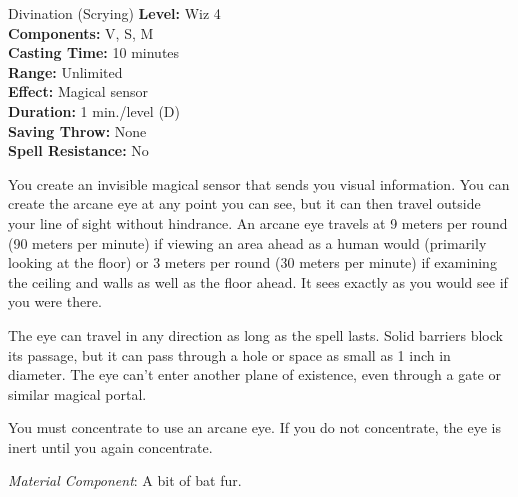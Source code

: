 {Divination (Scrying)}
{
	\textbf{Level:}
	Wiz 4\\
	\textbf{Components:}
	V, S, M\\
	\textbf{Casting Time:}
	10 minutes\\
	\textbf{Range:}
	Unlimited\\
	\textbf{Effect:}
	Magical sensor\\
	\textbf{Duration:}
	1 min./level (D)\\
	\textbf{Saving Throw:}
	None\\
	\textbf{Spell Resistance:}
	No\\
}
{
	You create an invisible magical sensor that sends you visual information. You can create the arcane eye at any point you can see, but it can then travel outside your line of sight without hindrance. An arcane eye travels at 9 meters per round (90 meters per minute) if viewing an area ahead as a human would (primarily looking at the floor) or 3 meters per round (30 meters per minute) if examining the ceiling and walls as well as the floor ahead. It sees exactly as you would see if you were there.

	The eye can travel in any direction as long as the spell lasts. Solid barriers block its passage, but it can pass through a hole or space as small as 1 inch in diameter. The eye can't enter another plane of existence, even through a gate or similar magical portal.

	You must concentrate to use an arcane eye. If you do not concentrate, the eye is inert until you again concentrate.

	\textit{Material Component}:
	A bit of bat fur.

}

